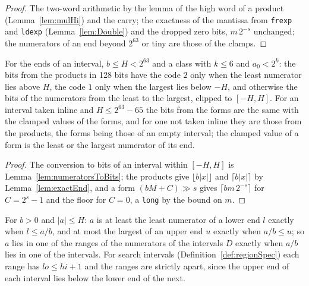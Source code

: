 \begin{proof}\leanok
  The two-word arithmetic by the lemma of the high word of a product
  (Lemma~\ref{lem:mulHi}) and the carry; the exactness of the mantissa from \verb|frexp| and
  \verb|ldexp| (Lemma~\ref{lem:Double}) and the dropped zero bits, $m\,2^{-s}$ unchanged; the
  numerators of an end beyond $2^{63}$ or tiny are those of the clamps.
\end{proof}

\begin{lemma}\label{lem:intervalBits}
  \leanok
  For the ends of an interval, $b \le H < 2^{63}$ and a class with $k \le 6$ and $a_0 < 2^k$: the
  bits from the products in 128 bits have the code $2$ only when the least numerator lies above $H$,
  the code $1$ only when the largest lies below $-H$, and otherwise the bits of the numerators from
  the least to the largest, clipped to $[-H, H]$. For an interval taken inline and
  $H \le 2^{63} - 65$ the bits from the forms are the same with the clamped values of the forms, and
  for one not taken inline they are those from the products, the forms being those of an empty
  interval; the clamped value of a form is the least or the largest numerator of its end.
\end{lemma}

\begin{proof}\leanok
  The conversion to bits of an interval within $[-H, H]$ is Lemma~\ref{lem:numeratorsToBits}; the
  products give $\lfloor b|x| \rfloor$ and $\lceil b|x| \rceil$ by Lemma~\ref{lem:exactEnd}, and a
  form $(b M + C) \gg s$ gives $\lceil b m\,2^{-s} \rceil$ for $C = 2^s - 1$ and the floor for
  $C = 0$, a \verb|long| by the bound on $m$.
\end{proof}

\begin{lemma}\label{lem:numeratorRanges}
  \leanok
  For $b > 0$ and $|a| \le H$: $a$ is at least the least numerator of a lower end $l$ exactly when
  $l \le a/b$, and at most the largest of an upper end $u$ exactly when $a/b \le u$; so $a$ lies in
  one of the ranges of the numerators of the intervals $D$ exactly when $a/b$ lies in one of the
  intervals. For search intervals (Definition~\ref{def:regionSpec}) each range has
  $\mathit{lo} \le \mathit{hi} + 1$ and the ranges are strictly apart, since the upper end of each
  interval lies below the lower end of the next.
\end{lemma}

